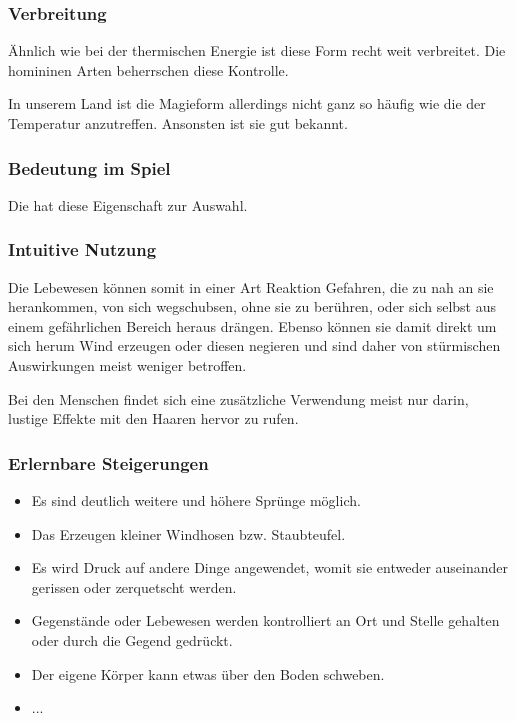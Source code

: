 \subsubsection{Verbreitung}
Ähnlich wie bei der thermischen Energie ist diese Form recht weit verbreitet. Die homininen Arten beherrschen diese Kontrolle. 

In unserem Land ist die Magieform allerdings nicht ganz so häufig wie die der Temperatur anzutreffen. Ansonsten ist sie gut bekannt.

\subsubsection{Bedeutung im Spiel}
Die  hat diese Eigenschaft zur Auswahl. 

\subsubsection{Intuitive Nutzung}
Die Lebewesen können somit in einer Art Reaktion Gefahren, die zu nah an sie herankommen, von sich wegschubsen, ohne sie zu berühren, oder sich selbst aus einem gefährlichen Bereich heraus drängen. Ebenso können sie damit direkt um sich herum Wind erzeugen oder diesen negieren und sind daher von stürmischen Auswirkungen meist weniger betroffen.

Bei den Menschen findet sich eine zusätzliche Verwendung meist nur darin, lustige Effekte mit den Haaren hervor zu rufen.

\subsubsection{Erlernbare Steigerungen}
\begin{itemize}
	\item Es sind deutlich weitere und höhere Sprünge möglich.
	\item Das Erzeugen kleiner Windhosen bzw. Staubteufel.
	\item Es wird Druck auf andere Dinge angewendet, womit sie entweder auseinander gerissen oder zerquetscht werden.
	\item Gegenstände oder Lebewesen werden kontrolliert an Ort und Stelle gehalten oder durch die Gegend gedrückt.
	\item Der eigene Körper kann etwas über den Boden schweben.
	\item ...
\end{itemize}

